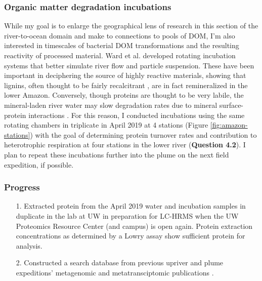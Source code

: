 \documentclass[12pt, letterpaper, twoside]{article}
\begin{document}
\bigskip

\subsubsection{Organic matter degradation incubations}

While my goal is to enlarge the geographical lens of research in this section of the river-to-ocean domain and make to connections to pools of DOM, I'm also interested in timescales of bacterial DOM transformations and the resulting reactivity of processed material. Ward et al. \cite{ward_marine_2018} developed rotating incubation systems that better simulate river flow and particle suspension. These have been important in deciphering the source of highly reactive materials, showing that lignins, often thought to be fairly recalcitrant \cite{hedges_fluxes_1988, gough_terrestrial_1993, opsahl_distribution_1997}, are in fact remineralized in the lower Amazon. Conversely, though proteins are thought to be very labile, the mineral-laden river water may slow degradation rates due to mineral surface-protein interactions \cite{keil_sorptive_1994, mayer_relationships_1994}. For this reason, I conducted incubations using the same rotating chambers in triplicate in April 2019 at 4 stations (Figure \ref{fig:amazon-stations}) with the goal of determining protein turnover rates and contribution to heterotrophic respiration at four stations in the lower river (\textbf{Question 4.2}). I plan to repeat these incubations further into the plume on the next field expedition, if possible. 

\subsubsection*{Progress}


\begin{enumerate}
	\item[1.] Extracted protein from the April 2019 water and incubation samples in duplicate in the lab at UW in preparation for LC-HRMS when the UW Proteomics Resource Center (and campus) is open again. Protein extraction concentrations as determined by a Lowry assay show sufficient protein for analysis. 
	\item[2.] Constructed a search database from previous upriver and plume expeditions' metagenomic and metatransciptomic publications \cite{satinsky_amazon_2014, doherty_bacterial_2017, satinsky_metagenomic_2015, ghai_metagenomics_2011}.
\end{enumerate}
\end{document}
